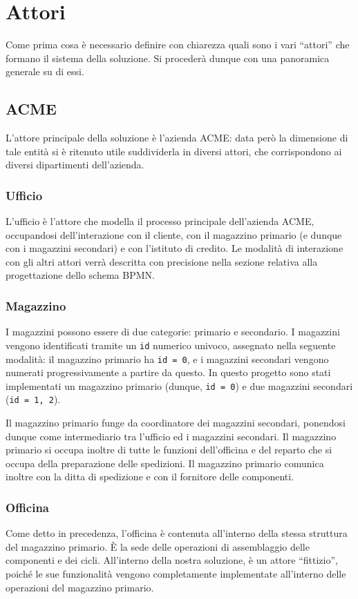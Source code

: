 \section{Attori}
Come prima cosa \`e necessario definire con chiarezza quali sono i vari
``attori'' che formano il sistema della soluzione.
Si proceder\`a dunque con una panoramica generale su di essi.

\subsection{ACME}
L'attore principale della soluzione \`e l'azienda ACME: data per\`o la
dimensione di tale entit\`a si \`e ritenuto utile suddividerla in
diversi attori, che corrispondono ai diversi dipartimenti dell'azienda.

\subsubsection{Ufficio}
L'ufficio \`e l'attore che modella il processo principale dell'azienda
ACME, occupandosi dell'interazione con il cliente, con il magazzino
primario (e dunque con i magazzini secondari) e con l'istituto di
credito. Le modalit\`a di interazione con gli altri attori verr\`a
descritta con precisione nella sezione relativa alla progettazione dello
schema BPMN.

\subsubsection{Magazzino}
I magazzini possono essere di due categorie: primario e secondario.
I magazzini vengono identificati tramite un {\tt id} numerico univoco,
assegnato nella seguente modalit\`a: il magazzino primario ha
{\tt id = 0}, e i magazzini secondari vengono numerati progressivamente
a partire da questo. In questo progetto sono stati implementati un
magazzino primario (dunque, {\tt id = 0}) e due magazzini secondari
({\tt id = 1, 2}).

Il magazzino primario funge da coordinatore dei magazzini secondari,
ponendosi dunque come intermediario tra l'ufficio ed i magazzini
secondari. \linebreak
Il magazzino primario si occupa inoltre di tutte le funzioni
dell'officina e del reparto che si occupa della preparazione delle
spedizioni.
Il magazzino primario comunica inoltre con la ditta di spedizione e con
il fornitore delle componenti.

\subsubsection{Officina}
Come detto in precedenza, l'officina \`e contenuta all'interno della
stessa struttura del magazzino primario. \`E la sede delle operazioni di
assemblaggio delle componenti e dei cicli. All'interno della nostra
soluzione, \`e un attore ``fittizio'', poich\'e le sue funzionalit\`a
vengono completamente implementate all'interno delle operazioni del
magazzino primario.

